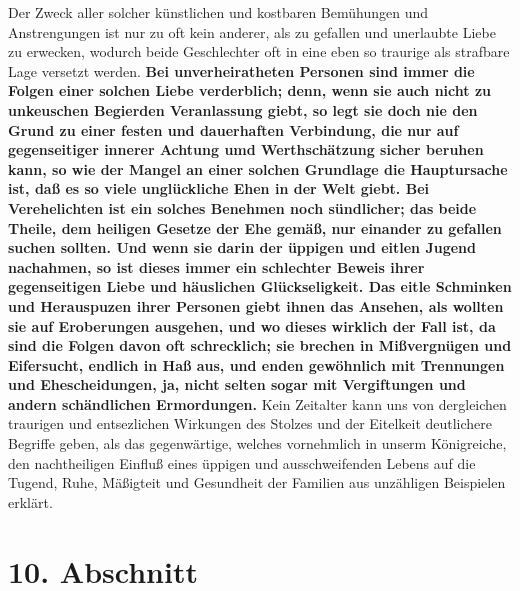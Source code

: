 Der Zweck aller solcher künstlichen und kostbaren Bemühungen und Anstrengungen
ist nur zu oft kein anderer, als zu gefallen und unerlaubte Liebe zu erwecken,
wodurch beide Geschlechter oft in eine eben so traurige als strafbare Lage
versetzt werden. 
\label{ref:11_09_kaputte_ehen} \textbf{Bei
unverheiratheten Personen sind immer die Folgen einer
solchen Liebe verderblich; denn, wenn sie auch nicht zu unkeuschen Begierden
Veranlassung giebt, so legt sie doch nie den Grund zu einer festen und
dauerhaften Verbindung, die nur auf gegenseitiger innerer Achtung umd
Werthschätzung sicher beruhen kann, so wie der Mangel an einer solchen Grundlage
die Hauptursache ist, daß es so viele unglückliche Ehen in der Welt giebt. Bei
Verehelichten ist ein solches Benehmen noch sündlicher; das beide Theile, dem
heiligen Gesetze der Ehe gemäß, nur einander zu gefallen suchen sollten. Und
wenn sie darin der üppigen und eitlen Jugend nachahmen, so ist dieses immer ein
schlechter Beweis ihrer gegenseitigen Liebe und häuslichen Glückseligkeit. Das
eitle Schminken und Herauspuzen ihrer Personen giebt ihnen das Ansehen, als
wollten sie auf Eroberungen ausgehen, und wo dieses wirklich der Fall ist, da
sind die Folgen davon oft schrecklich; sie brechen in Mißvergnügen und
Eifersucht, endlich in Haß aus, und enden gewöhnlich mit Trennungen und
Ehescheidungen, ja, nicht selten sogar mit Vergiftungen und andern schändlichen
Ermordungen.} Kein Zeitalter kann uns von dergleichen traurigen und entsezlichen
Wirkungen des Stolzes und der Eitelkeit deutlichere Begriffe geben, als das
gegenwärtige, welches vornehmlich in unserm Königreiche, den nachtheiligen
Einfluß eines üppigen und ausschweifenden Lebens auf die Tugend, Ruhe, Mäßigteit
und Gesundheit der Familien aus unzähligen Beispielen erklärt.

\section{10. Abschnitt} \label{kap11_ab10}

